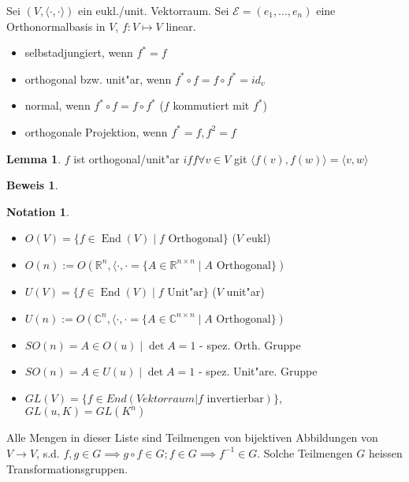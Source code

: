 \documentclass[oneside,fontsize=11pt,paper=a4,BCOR=0mm,DIV=12,automark,headsepline]{scrbook}
\DeclareMathOperator{\mEnd}{End}
\theoremstyle{remark}
\theoremstyle{definition}
\newtheorem*{notation}{Notation}
\newtheorem{lemma}{Lemma}[section]
\theoremstyle{definition}
\newtheorem*{prof}{Beweis}
\theoremstyle{remark}
\begin{document}
\begin{definition}
   Sei $(V, \langle {\cdot, \cdot} \rangle)$ ein eukl./unit. Vektorraum. Sei
  $\mathcal{E}=(e_1,...,e_n)$ eine Orthonormalbasis in $V$, $f: V\mapsto V $
  linear. 
  \begin{itemize}
  \item selbstadjungiert, wenn $f^*=f$
  \item orthogonal bzw. unit"ar, wenn $f^*\circ f = f\circ f^*=id_v$
  \item normal, wenn $f^*\circ f = f\circ f^* $ ($f$ kommutiert mit $f^*$)
  \item orthogonale Projektion, wenn $f^*=f, f^2=f$
  \end{itemize}
\end{definition}


\begin{lemma}
  $f$ ist orthogonal/unit"ar $iff \forall v\in V$ git $\langle {f(v), f(w)}
  \rangle = \langle {v,w} \rangle$
\end{lemma}

\begin{prof}
  \begin{itemize}
  \end{itemize}
\end{prof}
\begin{notation}
  \begin{itemize}
 \item $O(V)=\{f\in\mEnd (V) \mid f\text{ Orthogonal}\}$ ($V$ eukl)
  \item $O(n):= O(\mathbb{R}^n, \langle{\cdot, \cdot} = \{A\in
    \mathbb{R}^{n\times  n} \mid A \text{ Orthogonal}\})$
    \item $U(V)=\{f\in\mEnd (V) \mid f\text{ Unit"ar}\}$ ($V$ unit"ar)
  \item $U(n):= O(\mathbb{C}^n, \langle{\cdot, \cdot} = \{A\in
    \mathbb{C}^{n\times  n} \mid A \text{ Orthogonal}\})$
  \item $S O(n) = {A\in O(u) \mid \det A = 1}$ - spez. Orth. Gruppe
  \item $S  O(n) = {A\in U(u) \mid \det A = 1}$ - spez. Unit"are. Gruppe
  \item $GL(V)=\{f\in End(Vektorraum | f \text{ invertierbar})\}$, $GL(u, K)=GL(K^n)$
  \end{itemize}

  Alle Mengen in dieser Liste sind Teilmengen von bijektiven Abbildungen von
  $V\rightarrow V$, s.d. $f,g\in G \implies g\circ f \in G; f\in G \implies
  f^{-1}\in G$. Solche Teilmengen $G$ heissen Transformationsgruppen.
\end{notation}
\end{document}
